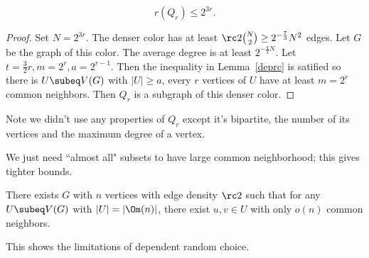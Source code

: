 \begin{thm}
\[r(Q_r)\le 2^{3r}.\] 
\end{thm}
\begin{proof}
Set $N=2^{3r}$. The denser color has at least $\rc2\binom N2\ge 2^{-\frac 73}N^2$ edges. Let $G$ be the graph of this color. The average degree is at least $2^{-\frac 43N}$. Let $t=\frac 32 r,m=2^r,a=2^{r-1}$. Then the inequality in Lemma~\ref{deprc} is satified so there is $U\subeq V(G)$ with $|U|\ge a$, every $r$ vertices of $U$ have at least $m=2^r$ common neighbors. Then $Q_r$ is a subgraph of this denser color.
\end{proof}
Note we didn't use any properties of $Q_r$ except it's bipartite, the number of its vertices and the maximum degree of a vertex.

We just need ``almost all" subsets to have large common neighborhood; this gives tighter bounds.
\begin{thm}
There exists $G$ with $n$ vertices with edge density $\rc 2$ %
such that for any $U\subeq V(G)$ with $|U|=|\Om(n)|$, there exist $u,v\in U$ with only $o(n)$ common neighbors.
\end{thm}
This shows the limitations of dependent random choice.
